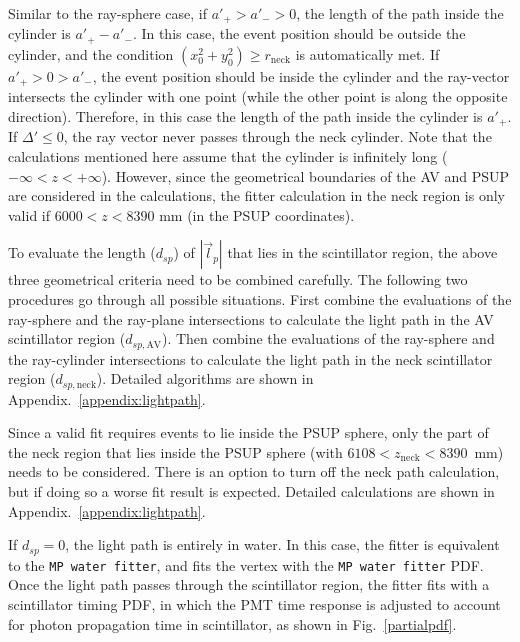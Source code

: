\begin{itemize}
Similar to the ray-sphere case, if $a'_{+} > a'_{-} > 0$, the length of the path inside the cylinder is $a'_{+} - a'_{-}$. In this case, the event position should be outside the cylinder, and the condition $(x^2_0+y^2_0)\geq r_\mathrm{neck}$ is automatically met. If $a'_+>0>a'_-$, the event position should be inside the cylinder and the ray-vector intersects the cylinder with one point (while the other point is along the opposite direction). Therefore, in this case the length of the path inside the cylinder is $a'_+$. If $\Delta'\leq0$, the ray vector never passes through the neck cylinder. Note that the calculations mentioned here assume that the cylinder is infinitely long ($-\infty<z<+\infty$). However, since the geometrical boundaries of the AV and PSUP are considered in the calculations, the fitter calculation in the neck region is only valid if $6000<z<8390$ mm (in the PSUP coordinates).

\end{itemize}

To evaluate the length ($d_{sp}$) of $|\vec{l}_p|$ that lies in the scintillator region, the above three geometrical criteria need to be combined carefully. The following two procedures go through all possible situations. First combine the evaluations of the ray-sphere and the ray-plane intersections to calculate the light path in the AV scintillator region ($d_{sp,\mathrm{AV}}$). Then combine the evaluations of the ray-sphere and the ray-cylinder intersections to calculate the light path in the neck scintillator region ($d_{sp,\mathrm{neck}}$). Detailed algorithms are shown in Appendix.~\ref{appendix:lightpath}.

Since a valid fit requires events to lie inside the PSUP sphere, only the part of the neck region that lies inside the PSUP sphere (with $6108<z_\mathrm{neck}<8390$~mm) needs to be considered. There is an option to turn off the neck path calculation, but if doing so a worse fit result is expected. Detailed calculations are shown in Appendix.~\ref{appendix:lightpath}.

If $d_{sp}=0$, the light path is entirely in water. In this case, the fitter is equivalent to the \texttt{MP water fitter}, and fits the vertex with the \texttt{MP water fitter} PDF. Once the light path passes through the scintillator region, the fitter fits with a scintillator timing PDF, in which the PMT time response is adjusted to account for photon propagation time in scintillator, as shown in Fig.~\ref{partialpdf}.

